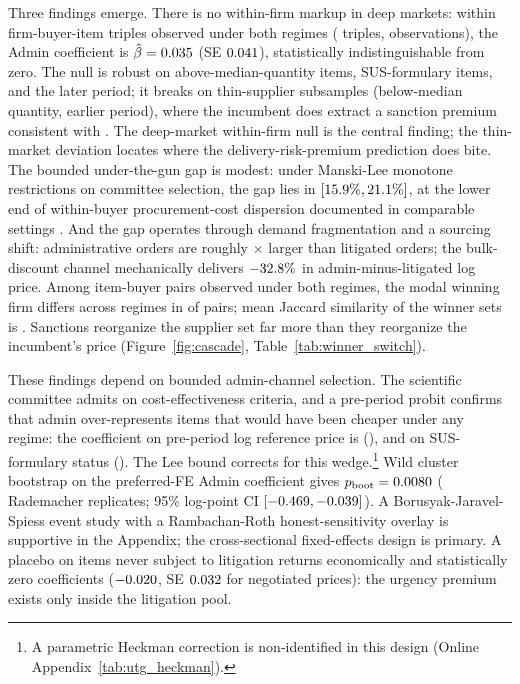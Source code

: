 Three findings emerge. There is no within-firm markup in deep
markets: within firm-buyer-item triples observed under both regimes
(\BPutgTripleCountUTG{} triples, \BPutgTripleNUTG{} observations),
the Admin coefficient is $\hat\beta=0.035$
(SE $0.041$), statistically indistinguishable from zero.
The null is robust on above-median-quantity items, SUS-formulary
items, and the later period; it breaks on thin-supplier subsamples
(below-median quantity, earlier period), where the incumbent does
extract a sanction premium consistent with
\citet{prendergast2007bureaucrats}. The deep-market within-firm null
is the central finding; the thin-market deviation locates where the
delivery-risk-premium prediction does bite. The bounded under-the-gun
gap is modest: under Manski-Lee monotone restrictions on committee
selection, the gap lies in
$[15.9\%, 21.1\%]$, at the lower end of
within-buyer procurement-cost dispersion documented in comparable
settings \citep[e.g.,][]{best2023procurement, bosio2022public}.
And the gap operates through demand fragmentation and a sourcing
shift: administrative orders are roughly
\BPutgQtyAdminFoldPref$\times$ larger than litigated orders; the
bulk-discount channel mechanically delivers $-32.8\%$ in
admin-minus-litigated log price. Among item-buyer pairs observed
under both regimes, the modal winning firm differs across regimes in
\BPwinnerSwitchDiffModalPct{} of pairs; mean Jaccard similarity of
the winner sets is \BPwinnerSwitchJaccardMean. Sanctions reorganize
the supplier set far more than they reorganize the incumbent's price
(Figure~\ref{fig:cascade}, Table~\ref{tab:winner_switch}).

These findings depend on bounded admin-channel selection. The
scientific committee admits on cost-effectiveness criteria, and a
pre-period probit confirms that admin over-represents items that
would have been cheaper under any regime: the coefficient on
pre-period log reference price is \BPutgProbitRefPriceCoef{}
(\BPutgProbitRefPricePval), and on SUS-formulary status
\BPutgProbitSUSCoef{} (\BPutgProbitSUSPval). The Lee bound corrects
for this wedge.\footnote{A parametric Heckman correction is
non-identified in this design (Online
Appendix~\ref{tab:utg_heckman}).} Wild cluster bootstrap on the
preferred-FE Admin coefficient gives
$p_{\mathrm{boot}}=0.0080$ (\BPutgBoottestB{} Rademacher
replicates; 95\% log-point CI
$[-0.469, -0.039]$). A
Borusyak-Jaravel-Spiess event study with a Rambachan-Roth
\citep{rambachan2023more} honest-sensitivity overlay is supportive
in the Appendix; the cross-sectional fixed-effects design is
primary. A placebo on items never subject to litigation returns
economically and statistically zero coefficients
($-0.020$, SE $0.032$ for negotiated prices):
the urgency premium exists only inside the litigation pool.

